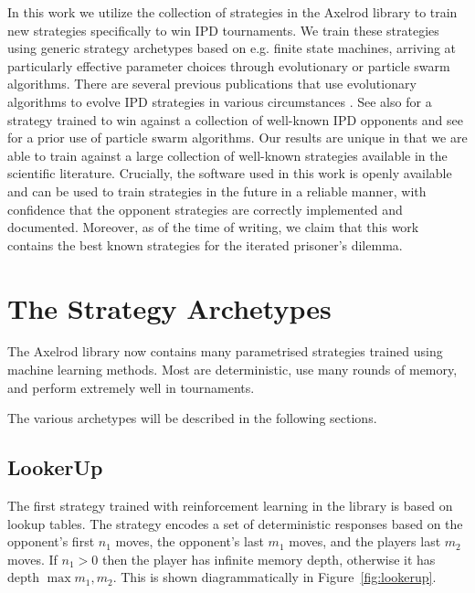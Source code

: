 \documentclass{article}
\begin{document}
In this work we utilize the collection of strategies in the Axelrod library
to train new strategies specifically to win IPD tournaments. We train these
strategies using generic strategy archetypes based on e.g. finite state
machines, arriving at particularly effective parameter choices through
evolutionary or particle swarm algorithms. There are several
previous publications that use evolutionary algorithms to
evolve IPD strategies in various circumstances
\cite{ashlock2006training, ashlock2015multiple, ashlock2006changes,
      ashlock2014shaped, ashlock2014evolution, barlow2015varying,
      fogel1993evolving, marks1989niche, sudo2015effects,
      vassiliades2010multiagent}. See also \cite{gaudesi2016exploiting} for a
strategy trained to win against a collection of well-known IPD opponents and see
\cite{franken2005particle} for a prior use of particle swarm algorithms. Our
results are unique in that we are able to train against a large collection of
well-known strategies available in the scientific literature. Crucially, the
software used in this work is openly available and can be used to train strategies
in the future in a reliable manner, with confidence that the opponent strategies
are correctly implemented and documented. Moreover, as of the time of writing,
we claim that this work contains the best known strategies for the iterated
prisoner's dilemma.

\section{The Strategy Archetypes}

The Axelrod library now contains many parametrised strategies trained using
machine learning
methods. Most are deterministic, use many rounds of memory, and perform
extremely well in tournaments.

The various archetypes will be described in the following sections.

\subsection{LookerUp}

The first strategy trained with reinforcement learning in the library is based
on lookup tables. The strategy encodes a set of deterministic responses
based on the opponent's first $n_1$ moves, the opponent's last $m_1$ moves, and
the players last $m_2$ moves. If $n_1 > 0$ then the player has infinite memory
depth, otherwise it has depth $\max{m_1, m_2}$.
This is shown diagrammatically in Figure~\ref{fig:lookerup}.
\end{document}

